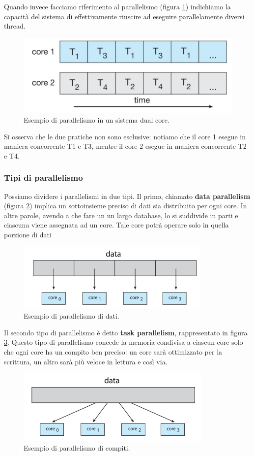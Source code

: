 Quando invece facciamo riferimento al parallelismo (figura \ref{fig:parallelismo}) indichiamo la capacità del sistema di effettivamente riuscire ad eseguire parallelamente diversi thread. 
\begin{figure}[!h]
    \centering
    \includegraphics[width=.5\textwidth]{../res/imgs/threads/parallelismo.png}
    \caption{Esempio di parallelismo in un sistema dual core.}
    \label{fig:parallelismo}
\end{figure}
Si osserva che le due pratiche non sono esclusive: notiamo che il core 1 esegue in maniera concorrente T1 e T3, mentre il core 2 esegue in maniera concorrente T2 e T4.

\subsubsection{Tipi di parallelismo}
Possiamo dividere i parallelismi in due tipi. Il primo, chiamato \textbf{data parallelism} (figura \ref{fig:data_parallelism}) implica un sottoinsieme preciso di dati sia distribuito per ogni core. In altre parole, avendo a che fare un un largo database, lo si suddivide in parti e ciascuna viene assegnata ad un core. Tale core potrà operare solo in quella porzione di dati
\begin{figure}[!h]
    \centering
    \includegraphics[width = .5\textwidth]{../res/imgs/threads/data_parallelism.png}
    \caption{Esempio di parallelismo di dati.}
    \label{fig:data_parallelism}
\end{figure}

\noindent Il secondo tipo di parallelismo è detto \textbf{task parallelism}, rappresentato in figura \ref{fig:task_parallelism}. Questo tipo di parallelismo concede la memoria condivisa a ciascun core solo che ogni core ha un compito ben preciso: un core sarà ottimizzato per la scrittura, un altro sarà più veloce in lettura e così via.
\begin{figure}[!h]
    \centering
    \includegraphics[width=.5\textwidth]{../res/imgs/threads/task_parallelism.png}
    \caption{Esempio di parallelismo di compiti.}
    \label{fig:task_parallelism}
\end{figure}
% 
